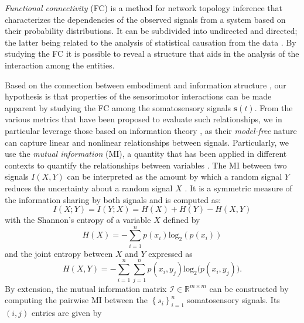 \emph{Functional connectivity} (FC) is a method for network topology inference that characterizes the dependencies of the observed signals from a system based on their probability distributions\cite{Friston2011Functionaleffectiveconnectivity}. It can be subdivided into undirected and directed; the latter being related to the analysis of statistical causation from the data \cite{Bastos2016tutorialreviewfunctional}. By studying the FC  it is possible to reveal a structure that aids in the analysis of the interaction among the entities.

Based on the connection between embodiment and information structure \cite{Pfeifer2007Selforganizationembodiment}, our hypothesis is that properties of the sensorimotor interactions can be made apparent by studying the FC among the somatosensory signals $ \bm{s}(t) $. From the various metrics that have been proposed to evaluate such relationships, we in particular leverage those based on information theory \cite{Bonsignorio2020EntropyBasedMetrics,Bonsignorio2013Quantifyingevolutionaryself}, as their \emph{model-free} nature can capture linear and nonlinear relationships between signals. Particularly, we use the \emph{mutual information} (MI), a quantity that has been applied in different contexts to quantify the relationships between variables \cite{Steuer2002mutualinformationdetecting}. The MI between two signals $ I\left(X,Y\right) $ can be interpreted as the amount by which a random signal $ Y $ reduces the uncertainty about a random signal $ X $ \cite{Cover1999Elementsinformationtheory}. It is a symmetric measure of the information sharing by both signals and is computed as:
\begin{equation}\label{eq:mutual_information}
	I\left(X;Y\right) =I\left(Y;X\right) = H(X) + H(Y) - H(X,Y)
\end{equation}
with the Shannon's entropy of a variable $X$ defined by 
\begin{equation}\label{eq:entropy}
	H(X) = -\sum_{i=1}^{n}p(x_i)\text{log}_2\left(p\left(x_i\right)\right)
\end{equation}
and the joint entropy between $ X $ and $ Y $ expressed as
\begin{equation}\label{eq:joint_entropy}
	H(X,Y) = -\sum_{i=1}^{n}\sum_{j=1}^{n} p(x_i,y_j)\text{log}_2\big(p\left(x_i,y_j\right)\big).
\end{equation}
By extension, the mutual information matrix $\bm{\mathcal{I}} \in \mathbb{R}^{m \times m}$ can be constructed by computing the pairwise MI between the $\left\lbrace s_i\right\rbrace^n_{i=1}$ somatosensory signals. Its $(i,j)$ entries are given by
